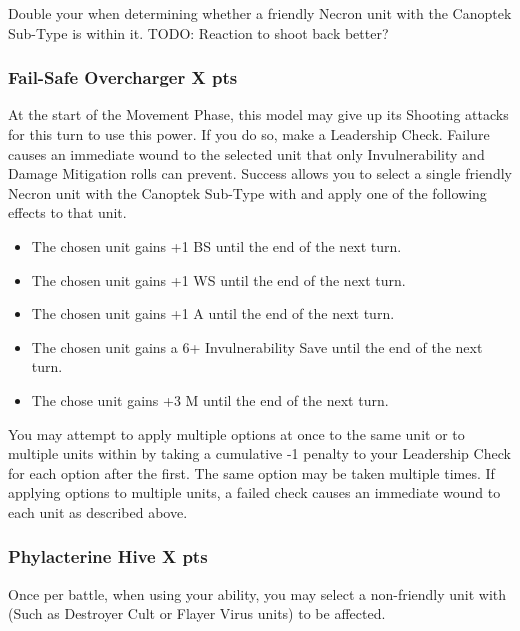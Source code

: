 Double your  when determining whether a friendly Necron unit with the Canoptek Sub-Type is within it. TODO: Reaction to shoot back better?

\subsubsection[Fail-Safe Overcharger ]{Fail-Safe Overcharger  \hrulefill X pts}

At the start of the Movement Phase, this model may give up its Shooting attacks for this turn to use this power. If you do so, make a Leadership Check. Failure causes an immediate wound to the selected unit that only Invulnerability and Damage Mitigation rolls can prevent. Success allows you to select a single friendly Necron unit with the Canoptek Sub-Type with  and apply one of the following effects to that unit.

\begin{itemize}
	\item The chosen unit gains +1 BS until the end of the next turn.
	\item The chosen unit gains +1 WS until the end of the next turn.
	\item The chosen unit gains +1 A until the end of the next turn.
	\item The chosen unit gains a 6+ Invulnerability Save until the end of the next turn.
	\item The chose unit gains +3 M until the end of the next turn.
\end{itemize}

You may attempt to apply multiple options at once to the same unit or to multiple units within  by taking a cumulative -1 penalty to your Leadership Check for each option after the first. The same option may be taken multiple times. If applying options to multiple units, a failed check causes an immediate wound to each unit as described above.

\subsubsection[Phylacterine Hive ]{Phylacterine Hive  \hrulefill X pts}

Once per battle, when using your  ability, you may select a non-friendly unit with  (Such as Destroyer Cult or Flayer Virus units) to be affected.

